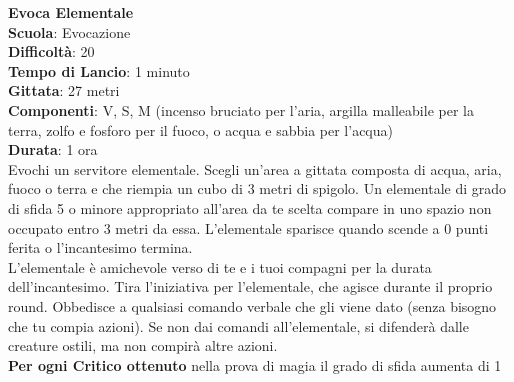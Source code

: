 \begin{multicols}{2}
\medskip\textbf{Evoca Elementale}\\
\textbf{Scuola}: Evocazione\\
\textbf{Difficoltà}:  20\\
\textbf{Tempo di Lancio}: 1 minuto\\
\textbf{Gittata}: 27 metri\\
\textbf{Componenti}: V, S, M (incenso bruciato per l’aria, argilla malleabile per la terra, zolfo e fosforo per il fuoco, o acqua e sabbia per l’acqua) \\
\textbf{Durata}: 1 ora\\
Evochi un servitore elementale. Scegli un'area a gittata composta di acqua, aria, fuoco o terra e che riempia un cubo di 3 metri di spigolo. Un elementale di grado di sfida 5 o minore appropriato all'area da te scelta compare in uno spazio non occupato entro 3 metri da essa. L’elementale sparisce quando scende a 0 punti ferita o l'incantesimo termina.\\
L’elementale è amichevole verso di te e i tuoi compagni per la durata dell'incantesimo. Tira l’iniziativa per l’elementale, che agisce durante il proprio round. Obbedisce a qualsiasi comando verbale che gli viene dato (senza bisogno che tu compia azioni). Se non dai comandi all'elementale, si difenderà dalle creature ostili, ma non compirà altre azioni.\\
\textbf{Per ogni Critico ottenuto} nella prova di magia il grado di sfida aumenta di 1


\end{multicols}
